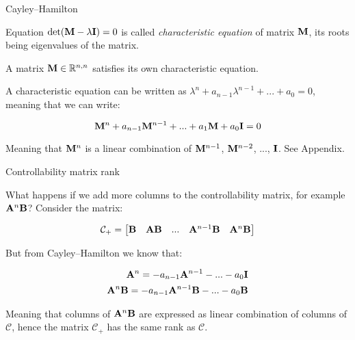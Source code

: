 \documentclass{beamer}
\begin{document}
\begin{frame}{Cayley–Hamilton}
	\begin{flushleft}
		
		Equation $\text{det}(\mathbf{M} - \lambda\mathbf{I}) = 0$ is called \emph{characteristic equation} of matrix $\mathbf{M}$, its roots being eigenvalues of the matrix.
		
		\bigskip
		
		\begin{theorem}
			A matrix $\mathbf{M} \in \mathbb{R}^{n, n}$ satisfies its own characteristic equation.
		\end{theorem}
		
		A characteristic equation can be written as $\lambda^n + a_{n-1}\lambda^{n-1} + ... + a_0  = 0$, meaning that we can write:
		
		\begin{equation}
			\mathbf{M}^n + a_{n-1}\mathbf{M}^{n-1} + ... + a_1\mathbf{M} + a_0\mathbf{I}  = 0
		\end{equation}	
		
		Meaning that \textcolor{mydarkblue}{$\mathbf{M}^n$ is a linear combination of $\mathbf{M}^{n-1}$, $\mathbf{M}^{n-2}$, ..., $\mathbf{I}$}. See Appendix.
		
	\end{flushleft}
\end{frame}



\begin{frame}{Controllability matrix rank}
	\begin{flushleft}
		
		What happens if we add more columns to the controllability matrix, for example $\mathbf{A}^n \mathbf{B}$? Consider the matrix:
		
		\begin{equation}
			\mathcal{C}_+ = \begin{bmatrix}
				\mathbf{B} &
				\mathbf{A} \mathbf{B} & ... &
				\mathbf{A}^{n - 1} \mathbf{B} &
				\mathbf{A}^n \mathbf{B}
			\end{bmatrix}
		\end{equation}
		
		But from Cayley–Hamilton we know that: 
		
		\begin{align}
			\mathbf{A}^n = -a_{n-1}\mathbf{A}^{n-1} - ... - a_0\mathbf{I} 
			\\
			\mathbf{A}^n\mathbf{B} = -a_{n-1}\mathbf{A}^{n-1}\mathbf{B} - ... - a_0\mathbf{B}
		\end{align}
		
		Meaning that columns of $\mathbf{A}^n\mathbf{B}$ are expressed as linear combination of columns of $\mathcal{C}$, hence the matrix $\mathcal{C}_+$ has the same rank as $\mathcal{C}$.
		
	\end{flushleft}
\end{frame}
\end{document}
